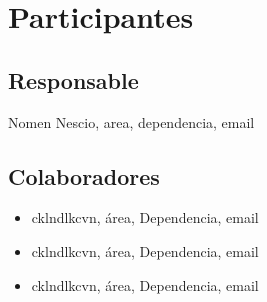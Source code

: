 \section{Participantes}
\subsection{Responsable}
Nomen Nescio, area, dependencia, email
\subsection{Colaboradores} 
\begin{itemize}
\item cklndlkcvn, \'area, Dependencia, email
\item cklndlkcvn, \'area, Dependencia, email
\item cklndlkcvn, \'area, Dependencia, email
\end{itemize}